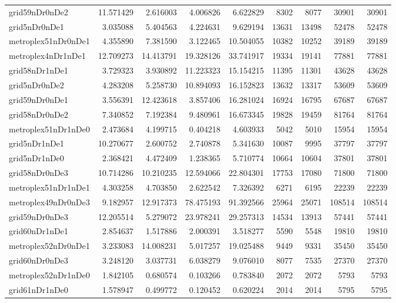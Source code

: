 \begin{longtable}{|l|r|r|r|r|r|r|r|r|}
grid59nDr0nDe2 & 11.571429 & 2.616003 & 4.006826 & 6.622829 & 8302 & 8077 & 30901 & 30901 \\
grid5nDr0nDe1 & 3.035088 & 5.404563 & 4.224631 & 9.629194 & 13631 & 13498 & 52478 & 52478 \\
metroplex51nDr0nDe1 & 4.355890 & 7.381590 & 3.122465 & 10.504055 & 10382 & 10252 & 39189 & 39189 \\
metroplex4nDr1nDe1 & 12.709273 & 14.413791 & 19.328126 & 33.741917 & 19334 & 19141 & 77881 & 77881 \\
grid58nDr1nDe1 & 3.729323 & 3.930892 & 11.223323 & 15.154215 & 11395 & 11301 & 43628 & 43628 \\
grid5nDr0nDe2 & 4.283208 & 5.258730 & 10.894093 & 16.152823 & 13632 & 13317 & 53609 & 53609 \\
grid59nDr0nDe1 & 3.556391 & 12.423618 & 3.857406 & 16.281024 & 16924 & 16795 & 67687 & 67687 \\
grid58nDr0nDe2 & 7.340852 & 7.192384 & 9.480961 & 16.673345 & 19828 & 19459 & 81764 & 81764 \\
metroplex51nDr1nDe0 & 2.473684 & 4.199715 & 0.404218 & 4.603933 & 5042 & 5010 & 15954 & 15954 \\
grid5nDr1nDe1 & 10.270677 & 2.600752 & 2.740878 & 5.341630 & 10087 & 9995 & 37797 & 37797 \\
grid5nDr1nDe0 & 2.368421 & 4.472409 & 1.238365 & 5.710774 & 10664 & 10604 & 37801 & 37801 \\
grid58nDr0nDe3 & 10.714286 & 10.210235 & 12.594066 & 22.804301 & 17753 & 17080 & 71800 & 71800 \\
metroplex51nDr1nDe1 & 4.303258 & 4.703850 & 2.622542 & 7.326392 & 6271 & 6195 & 22239 & 22239 \\
metroplex49nDr0nDe3 & 9.182957 & 12.917373 & 78.475193 & 91.392566 & 25964 & 25071 & 108514 & 108514 \\
grid59nDr0nDe3 & 12.205514 & 5.279072 & 23.978241 & 29.257313 & 14534 & 13913 & 57441 & 57441 \\
grid60nDr1nDe1 & 2.854637 & 1.517886 & 2.000391 & 3.518277 & 5590 & 5548 & 19810 & 19810 \\
metroplex52nDr0nDe1 & 3.233083 & 14.008231 & 5.017257 & 19.025488 & 9449 & 9331 & 35450 & 35450 \\
grid60nDr0nDe3 & 3.248120 & 3.037731 & 6.038279 & 9.076010 & 8077 & 7535 & 27370 & 27370 \\
metroplex52nDr1nDe0 & 1.842105 & 0.680574 & 0.103266 & 0.783840 & 2072 & 2072 & 5793 & 5793 \\
grid61nDr1nDe0 & 1.578947 & 0.499772 & 0.120452 & 0.620224 & 2014 & 2014 & 5795 & 5795 \\

\end{longtable}

